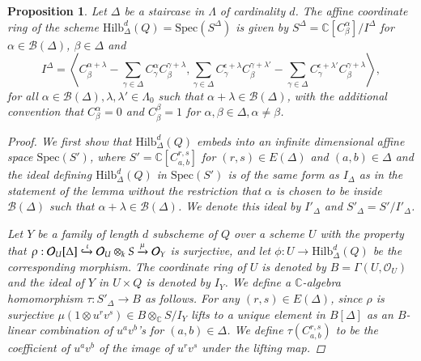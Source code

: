 \documentclass{amsart}[12pt]
\newtheorem{prop}[theorem]{Proposition}
\theoremstyle{definition}
\theoremstyle{remark}
\numberwithin{equation}{section}
\begin{document}
\begin{prop}\label{cab}
Let $\Delta$ be a staircase in $\Lambda$ of cardinality $d$. The affine coordinate ring of the scheme $\mathrm{Hilb}^d_{\Delta}(Q) = \mathrm{Spec}(S^{\Delta})$ is given by $S^{\Delta} = \mathbb{C}[C^{\alpha}_{\beta}]/I^{\Delta}$ for $\alpha \in \mathcal{B}(\Delta)$, $\beta \in \Delta$ and
\begin{equation}
I^{\Delta} = \left\langle C^{\alpha + \lambda}_{\beta} - \sum_{\gamma \in \Delta}C^{\alpha}_{\gamma}C^{\gamma + \lambda}_{\beta},  \sum_{\gamma \in \Delta}C^{\epsilon + \lambda}_{\gamma}C^{\gamma + \lambda'}_{\beta} - \sum_{\gamma \in \Delta}C^{\epsilon + \lambda'}_{\gamma}C^{\gamma + \lambda}_{\beta} \right\rangle,
\end{equation}
for all $\alpha \in \mathcal{B}(\Delta), \lambda, \lambda' \in \Lambda_0$ such that $\alpha + \lambda \in \mathcal{B}(\Delta)$, with the additional convention that $C^{\alpha}_{\beta} = 0$ and $C^{\beta}_{\beta} = 1$ for $\alpha, \beta \in \Delta, \alpha \neq \beta$.
\begin{proof}
We first show that $\mathrm{Hilb}^d_{\Delta}(Q)$ embeds into an infinite dimensional affine space $\mathrm{Spec}(S')$, where $S' = \mathbb{C}[C^{r, s}_{a, b}]$ for $(r, s) \in E(\Delta)$ and $(a, b) \in \Delta$ and the ideal defining $\mathrm{Hilb}^d_{\Delta}(Q)$ in $\mathrm{Spec}(S')$ is of the same form as $I_{\Delta}$ as in the statement of the lemma without the restriction that $\alpha$ is chosen to be inside $\mathcal{B}(\Delta)$ such that $\alpha + \lambda \in \mathcal{B}(\Delta)$. We denote this ideal by $I'_{\Delta}$ and $S'_{\Delta} = S'/I'_{\Delta}$.

Let $Y$ be a family of length $d$ subscheme of $Q$ over a scheme $U$ with the property that $\rho: \mathcal{O}_U[\Delta] \xhookrightarrow{\iota} \mathcal{O}_U \otimes_k S \xrightarrow{\mu} \mathcal{O}_Y$ is surjective, and let $\phi: U \to \mathrm{Hilb}^d_{\Delta}(Q)$ be the corresponding morphism. The coordinate ring of $U$ is denoted by $B = \Gamma(U, \mathcal{O}_U)$ and the ideal of $Y$ in $U \times Q$ is denoted by $I_Y$. We define a $\mathbb{C}$-algebra homomorphism $\tau: S'_{\Delta} \to B$ as follows. For any $(r, s) \in E(\Delta)$,  since $\rho$ is surjective $\mu(1 \otimes u^rv^s) \in B \otimes_{\mathbb{C}} S /I_Y$ lifts to a unique element in $B[\Delta]$ as an $B$-linear combination of $u^av^b$'s for $(a, b) \in \Delta$. We define $\tau(C^{r, s}_{a, b})$ to be the coefficient of $u^av^b$ of the image of $u^rv^s$ under the lifting map.


\end{proof}
\end{prop}
\end{document}
